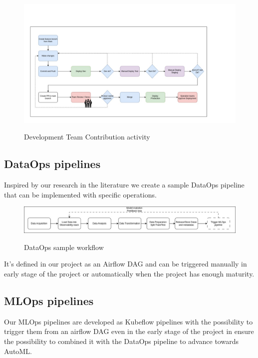 \begin{figure}[!htbp]
    \centering
    \caption{Development Team Contribution activity}
    \includegraphics[scale=0.3]{images/project/cicd-workflow-p2}
    \label{fig:cd-workflow-p2}
\end{figure}


\subsection{DataOps pipelines}\label{subsec:dataops-pipelines}
Inspired by our research in the literature we create a sample DataOps pipeline that can be implemented with specific
operations.

\begin{figure}[!htbp]
    \centering
    \caption{DataOps sample workflow}
    \includegraphics[scale=0.3]{images/project/dataops-workflow}
    \label{fig:dataops-workflow}
\end{figure}

It's defined in our project as an Airflow DAG and can be triggered manually in early stage of the project or
automatically when the project has enough maturity.

\subsection{MLOps pipelines}\label{subsec:mlops-pipelines}
Our MLOps pipelines are developed as Kubeflow pipelines with the possibility to trigger them from an airflow DAG
even in the early stage of the project in ensure the possibility to combined it with the DataOps pipeline to advance towards AutoML.

